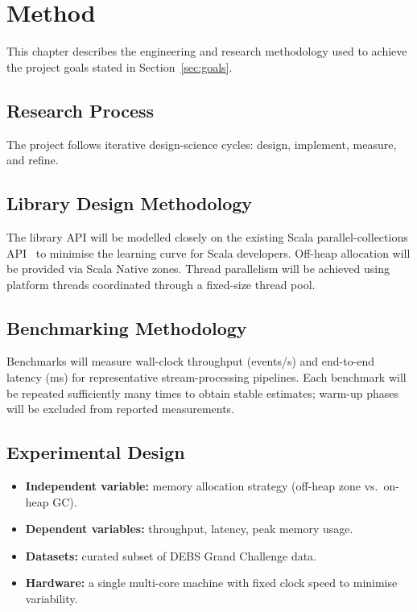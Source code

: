 \documentclass[
  english,   %
  bibtex,    %
]{kththesis}
\begin{document}
\chapter{Method}
\label{ch:methods}

This chapter describes the engineering and research methodology used to
achieve the project goals stated in Section~\ref{sec:goals}.

\section{Research Process}
\label{sec:researchProcess}

The project follows iterative design-science cycles: design, implement,
measure, and refine.

\section{Library Design Methodology}

The library \gls{API} will be modelled closely on the existing Scala
parallel-collections \gls{API}~\cite{prokopec_parallel_2011} to minimise the
learning curve for Scala developers.  Off-heap allocation will be provided
via Scala Native zones.  Thread parallelism will be achieved using
platform threads coordinated through a fixed-size thread pool.

\section{Benchmarking Methodology}
\label{sec:benchmarkingMethod}

Benchmarks will measure wall-clock throughput (events/s) and end-to-end
latency (ms) for representative stream-processing pipelines.  Each benchmark
will be repeated sufficiently many times to obtain stable estimates;
warm-up phases will be excluded from reported measurements.

\section{Experimental Design}
\label{sec:experimentalDesign}

\begin{itemize}
  \item \textbf{Independent variable:} memory allocation strategy
        (off-heap zone vs.\ on-heap \gls{GC}).
  \item \textbf{Dependent variables:} throughput, latency, peak memory usage.
  \item \textbf{Datasets:} curated subset of \gls{DEBS} Grand Challenge data.
  \item \textbf{Hardware:} a single multi-core machine with fixed clock speed
        to minimise variability.
\end{itemize}
\end{document}

